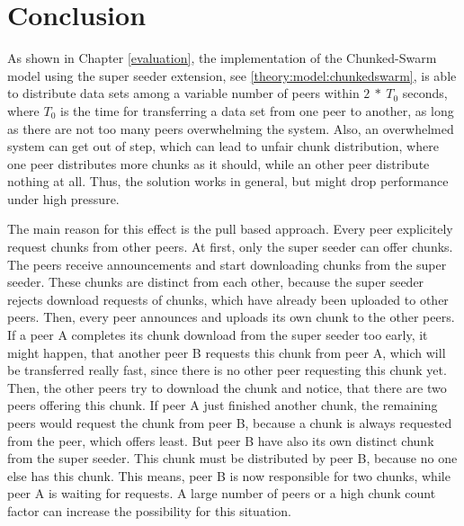 
\chapter{Conclusion}
\label{conclusion}

As shown in Chapter \ref{evaluation}, the implementation of the Chunked-Swarm model using the super seeder extension, see \ref{theory:model:chunkedswarm}, is able to distribute data sets among a variable number of peers within $2\:*\:T_0$ seconds, where $T_0$ is the time for transferring a data set from one peer to another, as long as there are not too many peers overwhelming the system. Also, an overwhelmed system can get out of step, which can lead to unfair chunk distribution, where one peer distributes more chunks as it should, while an other peer distribute nothing at all. Thus, the solution works in general, but might drop performance under high pressure.

The main reason for this effect is the pull based approach. Every peer explicitely request chunks from other peers. At first, only the super seeder can offer chunks. The peers receive announcements and start downloading chunks from the super seeder. These chunks are distinct from each other, because the super seeder rejects download requests of chunks, which have already been uploaded to other peers. Then, every peer announces and uploads its own chunk to the other peers. If a peer A completes its chunk download from the super seeder too early, it might happen, that another peer B requests this chunk from peer A, which will be transferred really fast, since there is no other peer requesting this chunk yet. Then, the other peers try to download the chunk and notice, that there are two peers offering this chunk. If peer A just finished another chunk, the remaining peers would request the chunk from peer B, because a chunk is always requested from the peer, which offers least. But peer B have also its own distinct chunk from the super seeder. This chunk must be distributed by peer B, because no one else has this chunk. This means, peer B is now responsible for two chunks, while peer A is waiting for requests. A large number of peers or a high chunk count factor can increase the possibility for this situation.

